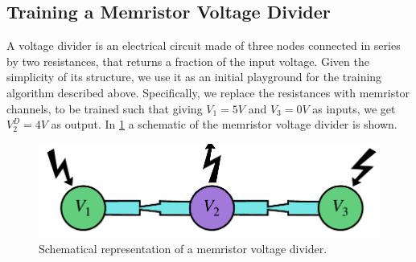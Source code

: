 \documentclass[reprint,superscriptaddress,prb,showkeys]{revtex4-2}
\begin{document}
\subsection{\label{sec:train_memr_vd}Training a Memristor Voltage Divider}
A voltage divider is an electrical circuit made of three nodes connected in series by two resistances, that returns a fraction of the input voltage. Given the simplicity of its structure, we use it as an initial playground for the training algorithm described above. Specifically, we replace the resistances with memristor channels, to be trained such that giving $V_1 = 5V$ and $V_3 = 0V$ as inputs, we get $V_2^D = 4V$ as output. In \cref{fig:vd_scheme} a schematic of the memristor voltage divider is shown.
\begin{figure}[t]
    \centering
    \includegraphics[width=0.5\columnwidth]{plots/voltage_divider/vd_scheme.pdf}
    \caption{Schematical representation of a memristor voltage divider.}\label{fig:vd_scheme}
\end{figure} 
\end{document}
